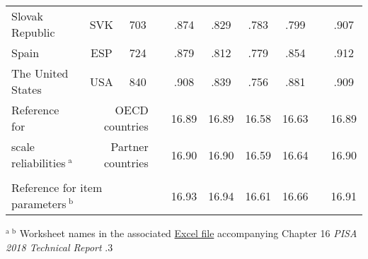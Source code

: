 {\begin{tabular}{lcc c@{\hskip 1cm} cccc c@{\hskip 1cm} c}
    Slovak Republic & SVK & 703 &       & .874 & .829 & .783 & .799 &       & .907 \\
    Spain & ESP & 724 &       & .879 & .812 & .779 & .854 &       & .912 \\
    The United States & USA & 840 &       & .908 & .839 & .756 & .881 &       & .909 \\
    \midrule
    Reference for & \multicolumn{2}{r}{OECD countries} & & \textsf{16.89} & \textsf{16.89} & \textsf{16.58} & \textsf{16.63} &       & \textsf{16.89} \\
    scale reliabilities$\ ^\text{a}$ & \multicolumn{2}{r}{Partner countries} & & \textsf{16.90} & \textsf{16.90} & \textsf{16.59} & \textsf{16.64} &       & \textsf{16.90} \\
    &&&&&&&&&\\
    \multicolumn{3}{l}{Reference for item parameters$\ ^\text{b}$} & & \textsf{16.93} & \textsf{16.94} & \textsf{16.61} & \textsf{16.66} & & \textsf{16.91}\\
    \bottomrule
    \end{tabular}
}{$^\text{a}\ ^\text{b}$ Worksheet names in the associated \href{https://www.oecd.org/pisa/data/pisa2018technicalreport/PISA2018_Technical_Report_chapter-16_Background_Questionnaires.xlsx}{Excel file} accompanying Chapter 16 \textit{PISA 2018 Technical Report} \parencite{PISAtech}.}{3}
